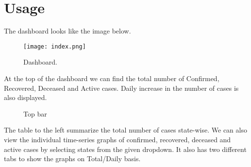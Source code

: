 \documentclass[11pt,a4paper]{report}
\begin{document}
    \section*{Usage}
    
    The dashboard looks like the image below.
    \newline

    \begin{figure}[h]
        \centering
        \texttt{[image: index.png]}
        \caption{Dashboard.}
    \end{figure}    
    
    \noindent At the top of the dashboard we can find the total number of Confirmed, Recovered, Deceased and Active cases. Daily increase in the number of cases is also displayed.
    
    \begin{figure}[h]
        \hspace*{-1.2cm} 
    \caption{Top bar}
    \end{figure}

    \noindent The table to the left summarize the total number of cases state-wise. We can also view the individual time-series graphs of confirmed, recovered, deceased and active cases by selecting states from the given dropdown. It also has two different tabs to show the graphs on Total/Daily basis.
\end{document}

